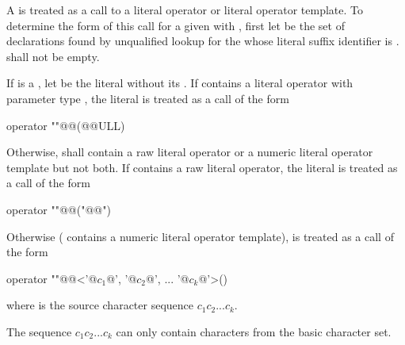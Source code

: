 \pnum
A  is treated as a call to a literal operator or
literal operator template.
To determine the form of this call for
a given  
with  ,
first let  be the set of declarations
found by unqualified lookup for the 
whose literal suffix identifier is .
 shall not be empty.

\pnum
If  is a , let  be the literal
without its . If  contains a literal operator with
parameter type , the literal  is treated as a call of
the form
\begin{codeblock}
operator ""@@(@@ULL)
\end{codeblock}
Otherwise,  shall contain a raw literal operator
or a numeric literal operator template but not both.
If  contains a raw literal operator,
the literal  is treated as a call of the form
\begin{codeblock}
operator ""@@("@@")
\end{codeblock}
Otherwise ( contains a numeric literal operator template),
 is treated as a call of the form
\begin{codeblock}
operator ""@@<'@$c_1$@', '@$c_2$@', ... '@$c_k$@'>()
\end{codeblock}
where  is the source character sequence $c_1c_2...c_k$.
\begin{note}
The sequence
$c_1c_2...c_k$ can only contain characters from the basic character set.
\end{note}

